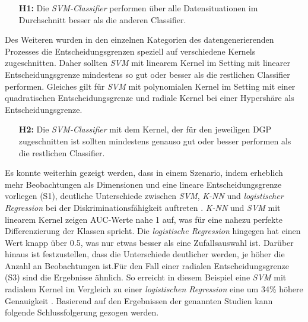 \documentclass[
]{article}
\begin{document}
\begin{minipage}{0.9\linewidth}
\begin{itemize}[leftmargin=0.1\linewidth]
\item[\textbf{H1:}] Die \textit{SVM-Classifier} performen über alle Datensituationen im Durchschnitt besser als die anderen Classifier.
\end{itemize}
\end{minipage}

Des Weiteren wurden in den einzelnen Kategorien des datengenerierenden
Prozesses die Entscheidungsgrenzen speziell auf verschiedene Kernels
zugeschnitten. Daher sollten \textit{SVM} mit linearem Kernel im Setting
mit linearer Entscheidungsgrenze mindestens so gut oder besser als die
restlichen Classifier performen. Gleiches gilt für \textit{SVM} mit
polynomialen Kernel im Setting mit einer quadratischen
Entscheidungsgrenze und radiale Kernel bei einer Hypershäre als
Entscheidungsgrenze.

\begin{minipage}{0.9\linewidth}
\begin{itemize}[leftmargin=0.1\linewidth]
\item[\textbf{H2:}] Die \textit{SVM-Classifier} mit dem Kernel, der für den jeweiligen DGP zugeschnitten ist sollten mindestens genauso gut oder besser performen als die restlichen Classifier.
\end{itemize}
\end{minipage}

Es konnte weiterhin gezeigt werden, dass in einem Szenario, indem
erheblich mehr Beobachtungen als Dimensionen und eine lineare
Entscheidungsgrenze vorliegen (S1), deutliche Unterschiede zwischen
\textit{SVM}, \textit{K-NN} und \textit{logistischer Regression} bei der
Diskriminationsfähigkeit auftreten
\parencite{entezari-malekiComparisonClassificationMethods2009}.
\textit{K-NN} und \textit{SVM} mit linearem Kernel zeigen AUC-Werte nahe
1 auf, was für eine nahezu perfekte Differenzierung der Klassen spricht.
Die \textit{logistische Regression} hingegen hat einen Wert knapp über
0.5, was nur etwas besser als eine Zufallsauswahl ist. Darüber hinaus
ist festzustellen, dass die Unterschiede deutlicher werden, je höher die
Anzahl an Beobachtungen ist.\newline Für den Fall einer radialen
Entscheidungsgrenze (S3) sind die Ergebnisse ähnlich. So erreicht in
diesem Beispiel eine \textit{SVM} mit radialem Kernel im Vergleich zu
einer \textit{logistischen Regression} eine um 34\% höhere Genauigkeit
\parencite{faveroClassificationPerformanceEvaluation2022}. Basierend auf
den Ergebnissen der genannten Studien kann folgende Schlussfolgerung
gezogen werden.
\end{document}
